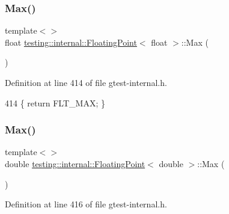 \mbox{\label{classtesting_1_1internal_1_1FloatingPoint_af2eda9331e679229a1baa3404b57b51d}} 
\subsubsection{\texorpdfstring{Max()}{Max()}\hspace{0.1cm}{\footnotesize\ttfamily [2/3]}}
{\footnotesize\ttfamily template$<$$>$ \\
float \hyperlink{classtesting_1_1internal_1_1FloatingPoint}{testing\+::internal\+::\+Floating\+Point}$<$ float $>$\+::Max (\begin{DoxyParamCaption}{ }\end{DoxyParamCaption})\hspace{0.3cm}{\ttfamily [inline]}}



Definition at line 414 of file gtest-\/internal.\+h.


\begin{DoxyCode}
414 \{ \textcolor{keywordflow}{return} FLT\_MAX; \}
\end{DoxyCode}
\mbox{\label{classtesting_1_1internal_1_1FloatingPoint_afc2e85c0e886cb13b2300e961c9a9648}} 
\subsubsection{\texorpdfstring{Max()}{Max()}\hspace{0.1cm}{\footnotesize\ttfamily [3/3]}}
{\footnotesize\ttfamily template$<$$>$ \\
double \hyperlink{classtesting_1_1internal_1_1FloatingPoint}{testing\+::internal\+::\+Floating\+Point}$<$ double $>$\+::Max (\begin{DoxyParamCaption}{ }\end{DoxyParamCaption})\hspace{0.3cm}{\ttfamily [inline]}}



Definition at line 416 of file gtest-\/internal.\+h.


